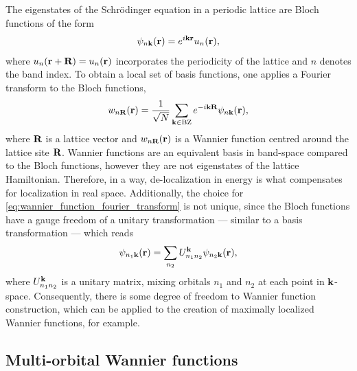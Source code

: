 \documentclass[\main/main.tex]{subfiles}
\begin{document}
The eigenstates of the Schrödinger equation in a periodic lattice are Bloch functions of the form
\begin{align}
	\psi_{n\textbf{k}}(\textbf{r})=e^{i\textbf{kr}}u_n(\textbf{r}),
\end{align}
where $u_n(\textbf{r}+\textbf{R})=u_n(\textbf{r})$ incorporates the periodicity of the lattice and $n$ denotes the band index. To obtain a local set of basis functions, one applies a Fourier transform to the Bloch functions,
\begin{align}\label{eq:wannier_function_fourier_transform}
	w_{n\textbf{R}}(\textbf{r})=\frac{1}{\sqrt{N}}\sum_{\textbf{k}\in\text{BZ}}e^{-i\textbf{kR}}\psi_{n\textbf{k}}(\textbf{r}),
\end{align}
where $\textbf{R}$ is a lattice vector and $w_{n\textbf{R}}(\textbf{r})$ is a Wannier function centred around the lattice site $\textbf{R}$. Wannier functions are an equivalent basis in band-space compared to the Bloch functions, however they are not eigenstates of the lattice Hamiltonian. Therefore, in a way, de-localization in energy is what compensates for localization in real space. Additionally, the choice for \eqref{eq:wannier_function_fourier_transform} is not unique, since the Bloch functions have a gauge freedom of a unitary transformation --- similar to a basis transformation --- which reads
\begin{align}\label{eq:unitary_transformation_bloch_functions}
	\psi_{n_1\textbf{k}}(\textbf{r})=\sum_{n_2}U_{n_1 n_2}^{\textbf{k}}\psi_{n_2\textbf{k}}(\textbf{r}),
\end{align}
where $U_{n_1 n_2}^{\textbf{k}}$ is a unitary matrix, mixing orbitals $n_1$ and $n_2$ at each point in $\textbf{k}$-space. Consequently, there is some degree of freedom to Wannier function construction, which can be applied to the creation of maximally localized Wannier functions, for example.

\subsection{Multi-orbital Wannier functions}
\end{document}
